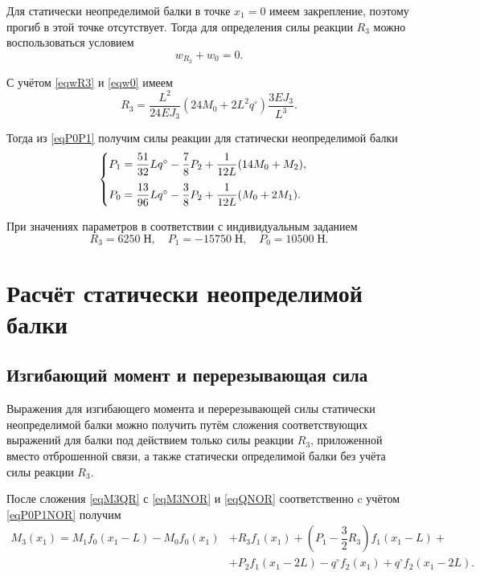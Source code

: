 \documentclass[12pt, a4paper]{article}
\begin{document}
	Для статически неопределимой балки в точке $x_1 = 0$ имеем закрепление, поэтому  прогиб в этой точке отсутствует. Тогда для определения силы реакции $R_3$ можно воспользоваться условием 
	\[
	w_{R_3} + w_0 = 0.
	\]
	
	С учётом \eqref{eqwR3} и \eqref{eqw0} имеем
	\begin{equation*}
		R_3 = \dfrac{L^2}{24 E J_3} \left( 24 M_0 +  2 L^2 q^{\circ} \right) \dfrac{3 E J_3}{L^3}.
	\end{equation*}
	
	Тогда из \eqref{eqP0P1} получим силы реакции для статически неопределимой балки
	\begin{equation*}
		\begin{cases}\vspace{0.75em}
			P_1 = \dfrac{51}{32} L q^{\circ} - \dfrac{7}{8} P_2 + \dfrac{1}{12L} (14 M_0 + M_2), \\
			P_0 = \dfrac{13}{96} L q^{\circ} - \dfrac{3}{8} P_2 + \dfrac{1}{12L} (M_0 + 2 M_1). \\
		\end{cases}
	\end{equation*}
	
	При значениях параметров в соответствии с индивидуальным заданием
	\vspace{-0.5em}
	\[
	R_3 = 6250 \; \text{Н}, \quad P_1 = -15750 \; \text{Н}, \quad P_0 = 10500 \; \text{Н}.
	\]
	
	\vspace{-1.5em}
	
	\section{Расчёт статически неопределимой балки}
	\subsection{Изгибающий момент и перерезывающая сила}
	
	Выражения для изгибающего момента и перерезывающей силы статически неопределимой балки можно получить путём сложения соответствующих выражений для балки под действием только силы реакции $R_3$, приложенной вместо отброшенной связи, а также статически определимой балки без учёта силы реакции $R_3$. 
	
	После сложения \eqref{eqM3QR} с \eqref{eqM3NOR} и \eqref{eqQNOR} соответственно c учётом \eqref{eqP0P1NOR} получим
	\vspace{-0.25em}
	\begin{equation*}
		\begin{split}
			M_3(x_1) = M_1 f_0(x_1 - L) - M_0 f_0(x_1) & + R_3 f_1(x_1) + \left( P_1 - \dfrac{3}{2} R_3 \right) f_1(x_1 - L) + \\ & + P_2 f_1(x_1 - 2L) - q^{\circ} f_2(x_1) + q^{\circ} f_2(x_1 - 2L).
		\end{split}
	\end{equation*}
	
\end{document}

